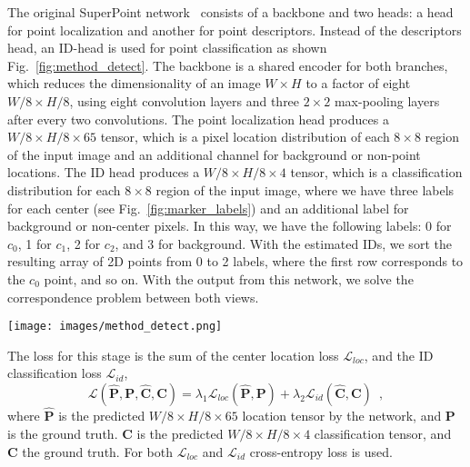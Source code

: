 \documentclass[final]{cvpr}
\begin{document}
The original SuperPoint network~\cite{detone2018superpoint} consists of a backbone and two heads: a head for point localization and another for point descriptors. Instead of the descriptors head, an ID-head is used for point classification as shown Fig.~\ref{fig:method_detect}. The backbone is a shared encoder for both branches, which reduces the dimensionality of an image $W \times H$ to a factor of eight $W/8 \times H/8$, using eight convolution layers and three $2 \times 2$ max-pooling layers after every two convolutions. The point localization head produces a $W/8 \times H/8 \times 65$ tensor, which is a pixel location distribution of each $8 \times 8$ region of the input image and an additional channel for background or non-point locations. The ID head produces a $W/8 \times H/8 \times 4$ tensor, which is a classification distribution for each $8 \times 8$ region of the input image, where we have three labels for each center (see Fig.~\ref{fig:marker_labels}) and an additional label for background or non-center pixels. In this way, we have the following labels: 0 for $c_0$, 1 for $c_1$, 2 for $c_2$, and 3 for background. With the estimated IDs, we sort the resulting array of 2D points from 0 to 2 labels, where the first row corresponds to the $c_0$ point, and so on. With the output from this network, we solve the correspondence problem between both views.

\begin{figure*}
    \centering
    \texttt{[image: images/method\_detect.png]}
    \caption{Sub-pixel centers detection for a single image.}
    \label{fig:method_detect}
\end{figure*}


The loss for this stage is the sum of the center location loss $\mathcal{L}_{loc}$, and the ID classification loss $\mathcal{L}_{id}$,
%
\begin{equation}
    \mathcal{L}(\hat{\mathbf{P}},\mathbf{P},\hat{\mathbf{C}},\mathbf{C}) = \lambda_1 \mathcal{L}_{loc}(\hat{\mathbf{P}},\mathbf{P}) + \lambda_2 \mathcal{L}_{id}(\hat{\mathbf{C}},\mathbf{C}) \enspace,
\end{equation}
%
where $\hat{\mathbf{P}}$ is the predicted $W/8 \times H/8 \times 65$ location tensor by the network, and $\mathbf{P}$ is the ground truth. $\hat{\mathbf{C}}$ is the predicted $W/8 \times H/8 \times 4$ classification tensor, and $\mathbf{C}$ the ground truth. For both $\mathcal{L}_{loc}$ and $\mathcal{L}_{id}$ cross-entropy loss is used.
\end{document}
